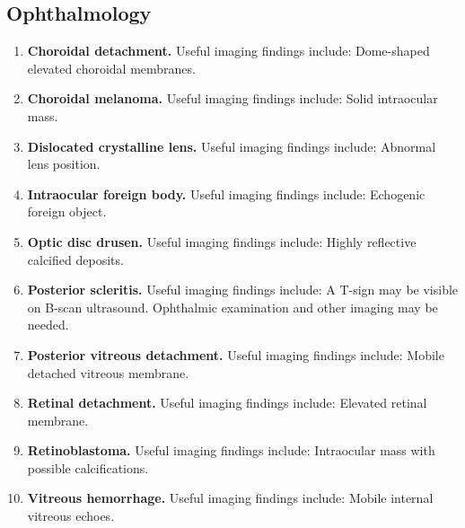 \subsection{Ophthalmology}
\begin{enumerate}[leftmargin=*,itemsep=0.45em,topsep=0.4em]
\item \textbf{Choroidal detachment.} Useful imaging findings include: Dome-shaped elevated choroidal membranes.
\item \textbf{Choroidal melanoma.} Useful imaging findings include: Solid intraocular mass.
\item \textbf{Dislocated crystalline lens.} Useful imaging findings include: Abnormal lens position.
\item \textbf{Intraocular foreign body.} Useful imaging findings include: Echogenic foreign object.
\item \textbf{Optic disc drusen.} Useful imaging findings include: Highly reflective calcified deposits.
\item \textbf{Posterior scleritis.} Useful imaging findings include: A T-sign may be visible on B-scan ultrasound. Ophthalmic examination and other imaging may be needed.
\item \textbf{Posterior vitreous detachment.} Useful imaging findings include: Mobile detached vitreous membrane.
\item \textbf{Retinal detachment.} Useful imaging findings include: Elevated retinal membrane.
\item \textbf{Retinoblastoma.} Useful imaging findings include: Intraocular mass with possible calcifications.
\item \textbf{Vitreous hemorrhage.} Useful imaging findings include: Mobile internal vitreous echoes.
\end{enumerate}

